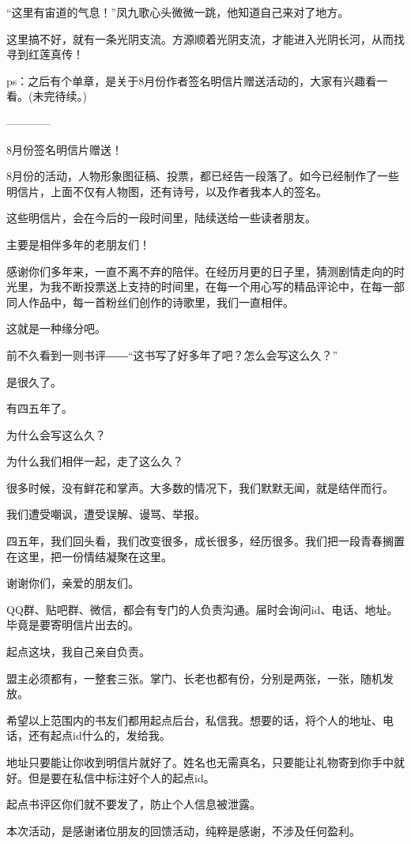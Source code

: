 \begin{this_body}
“这里有宙道的气息！”凤九歌心头微微一跳，他知道自己来对了地方。

这里搞不好，就有一条光阴支流。方源顺着光阴支流，才能进入光阴长河，从而找寻到红莲真传！

ps：之后有个单章，是关于8月份作者签名明信片赠送活动的，大家有兴趣看一看。(未完待续。)

------------

8月份签名明信片赠送！

8月份的活动，人物形象图征稿、投票，都已经告一段落了。如今已经制作了一些明信片，上面不仅有人物图，还有诗号，以及作者我本人的签名。

这些明信片，会在今后的一段时间里，陆续送给一些读者朋友。

主要是相伴多年的老朋友们！

感谢你们多年来，一直不离不弃的陪伴。在经历月更的日子里，猜测剧情走向的时光里，为我不断投票送上支持的时间里，在每一个用心写的精品评论中，在每一部同人作品中，每一首粉丝们创作的诗歌里，我们一直相伴。

这就是一种缘分吧。

前不久看到一则书评――“这书写了好多年了吧？怎么会写这么久？”

是很久了。

有四五年了。

为什么会写这么久？

为什么我们相伴一起，走了这么久？

很多时候，没有鲜花和掌声。大多数的情况下，我们默默无闻，就是结伴而行。

我们遭受嘲讽，遭受误解、谩骂、举报。

四五年，我们回头看，我们改变很多，成长很多，经历很多。我们把一段青春搁置在这里，把一份情结凝聚在这里。

谢谢你们，亲爱的朋友们。

QQ群、贴吧群、微信，都会有专门的人负责沟通。届时会询问id、电话、地址。毕竟是要寄明信片出去的。

起点这块，我自己亲自负责。

盟主必须都有，一整套三张。掌门、长老也都有份，分别是两张，一张，随机发放。

希望以上范围内的书友们都用起点后台，私信我。想要的话，将个人的地址、电话，还有起点id什么的，发给我。

地址只要能让你收到明信片就好了。姓名也无需真名，只要能让礼物寄到你手中就好。但是要在私信中标注好个人的起点id。

起点书评区你们就不要发了，防止个人信息被泄露。

本次活动，是感谢诸位朋友的回馈活动，纯粹是感谢，不涉及任何盈利。


\end{this_body}
